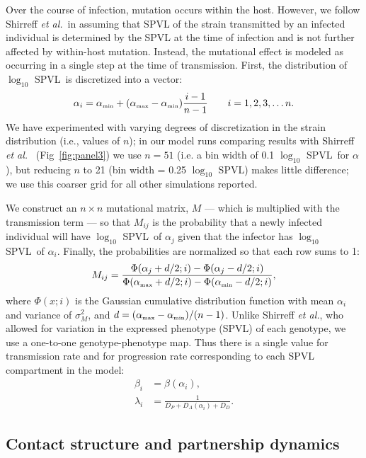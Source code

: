 \documentclass[10pt,letterpaper]{article}
\renewcommand{\figurename}{Fig}
\newcommand{\Lspvl}{$\log_{10}$ SPVL}
\newcommand{\etal}{\textit{et al.}}
\newcommand{\tsub}[2]{#1_{{\textrm{\tiny #2}}}}
\begin{document}
Over the course of infection, mutation occurs within the host. 
However, we follow Shirreff \etal\ in assuming that SPVL of the strain transmitted by an infected 
individual is determined by the SPVL at the time of infection and is not further affected by within-host mutation. 
Instead, the mutational effect is modeled as occurring in a single
step at the time of transmission. First, the distribution of \Lspvl\ is discretized into a vector:
\begin{equation}
\alpha_i = \tsub{\alpha}{min} + (\tsub{\alpha}{max} - \tsub{\alpha}{min})\frac{i-1}{n-1} \qquad i = 1,2,3, \dots n.
\end{equation}
We have experimented with varying degrees of discretization in the strain distribution (i.e., values of $n$); in our model runs comparing results with Shirreff \etal\ \cite{shirreff_transmission_2011} (\figurename~\ref{fig:panel3}) we use $n=51$ (i.e. a bin width of 0.1 \Lspvl\ for $\alpha$), but reducing $n$ to 21 (bin width = 0.25 \Lspvl) makes little difference; we use this coarser grid for all other simulations reported.

We construct an $n \times n$ mutational matrix, $M$ --- which is multiplied with the transmission term ---  so that $M_{ij}$ is the probability that a newly infected individual will have \Lspvl\ of $\alpha_j$ given that the infector has \Lspvl\ of $\alpha_i$. Finally, the probabilities are normalized so that each row sums to 1:
\begin{equation}
M_{ij} = \frac{\Phi(\alpha_j + d/2;i) - \Phi(\alpha_j - d/2;i)}{\Phi(\tsub{\alpha}{max} + d/2;i) - \Phi(\tsub{\alpha}{min} - d/2;i)},
\end{equation}
where $\Phi(x;i)$ is the Gaussian cumulative distribution function with mean $\alpha_i$ and variance of $\sigma_M^2$, and $d = (\tsub{\alpha}{max} - \tsub{\alpha}{min})/(n-1)$. 
Unlike Shirreff \etal, who allowed for variation in the expressed phenotype (SPVL) of each genotype,
we use a one-to-one genotype-phenotype map. Thus there is a single value for transmission rate and
for progression rate corresponding to each SPVL compartment in the model:
\begin{equation}
\begin{aligned}
\beta_i &= \beta(\alpha_i),\\
\lambda_i &= \frac{1}{D_P + D_A (\alpha_i) + D_D}.
\end{aligned}
\end{equation}

\subsection*{Contact structure and partnership dynamics}
\end{document}

